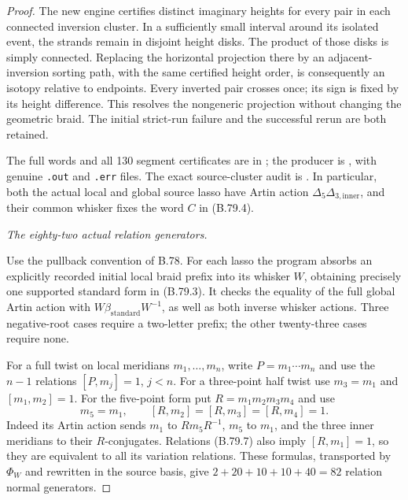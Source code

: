 \begin{proof}
The new engine certifies distinct imaginary heights for every pair
in each connected inversion cluster. In a sufficiently small interval
around its isolated event, the strands remain in disjoint height
disks. The product of those disks is simply connected. Replacing the
horizontal projection there by an adjacent-inversion sorting path,
with the same certified height order, is consequently an isotopy
relative to endpoints. Every inverted pair crosses once; its sign is
fixed by its height difference. This resolves the nongeneric projection
without changing the geometric braid. The initial strict-run failure
and the successful rerun are both retained.

The full words and all 130 segment certificates are in
; the producer
is , with genuine
\texttt{.out} and \texttt{.err} files. The exact source-cluster audit is
.
In particular, both the actual local and global source lasso have
Artin action \(\Delta_5\Delta_{3,\mathrm{inner}}\), and their common
whisker fixes the word \(C\) in (B.79.4).

\emph{The eighty-two actual relation generators.}\par
Use the pullback convention of B.78. For each lasso the program absorbs
an explicitly recorded initial local braid prefix into its whisker
\(W\), obtaining precisely one supported standard form in (B.79.3).
It checks the equality of the full global Artin action with
\(W\beta_{\mathrm{standard}}W^{-1}\), as well as both inverse
whisker actions. Three negative-root cases require a two-letter
prefix; the other twenty-three cases require none.

For a full twist on local meridians \(m_1,\ldots,m_n\), write
\(P=m_1\cdots m_n\) and use the \(n-1\) relations
\([P,m_j]=1\), \(j<n\). For a three-point half twist use
\(m_3=m_1\) and \([m_1,m_2]=1\). For the five-point form put
\(R=m_1m_2m_3m_4\) and use
\[
       m_5=m_1,\qquad [R,m_2]=[R,m_3]=[R,m_4]=1.
 \tag{B.79.7}
\]
Indeed its Artin action sends \(m_1\) to \(Rm_5R^{-1}\),
\(m_5\) to \(m_1\), and the three inner meridians to their
\(R\)-conjugates. Relations (B.79.7) also imply \([R,m_1]=1\),
so they are equivalent to all its variation relations. These formulas,
transported by \(\Phi_W\) and rewritten in the source basis, give
\(2+20+10+10+40=82\) relation normal generators.


\end{proof}
